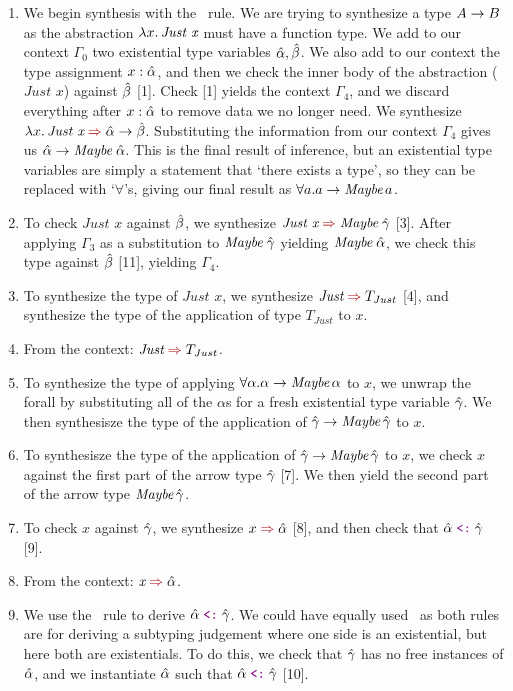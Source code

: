 \begin{enumerate}
    \item We begin synthesis with the \ArrIntroSyn\ rule. We are trying to synthesize a type $A \rightarrow B$  as the abstraction $\lambda x.\, \textit{Just x}$ must have a function type. We add to our context $\Gamma_0$ two existential type variables $\hat{\alpha}, \hat{\beta}$. We also add to our context the type assignment $x: \hat{\alpha}$, and then we check the inner body of the abstraction ($\textit{Just x}$) against $\hat{\beta}$ [1]. Check [1] yields the context $\Gamma_4$, and we discard everything after $x: \hat{\alpha}$ to remove data we no longer need. We synthesize $\lam{x} \textit{Just x} \syn \ahat \arr \bhat$. Substituting the information from our context $\Gamma_4$ gives us $\hat{\alpha} \rightarrow \textit{Maybe}\;\hat{\alpha}$. This is the final result of inference, but an existential type variables are simply a statement that `there exists a type', so they can be replaced with `$\forall$'s, giving our final result as $\forall a. a \rightarrow \textit{Maybe}\,a$.
    \item To check $\textit{Just x}$ against $\hat{\beta}$, we synthesize $\textit{Just x} \syn \textit{Maybe}\;\chat$ [3]. After applying $\Gamma_3$ as a substitution to $\textit{Maybe}\;\hat{\gamma}$ yielding $\textit{Maybe}\;\hat{\alpha}$, we check this type against $\hat{\beta}$ [11], yielding $\Gamma_4$. 
    \item To synthesize the type of $\textit{Just x}$, we synthesize $\textit{Just} \syn T_{Just}$ [4], and synthesize the type of the application of type $T_{Just}$ to $\textit{x}$.
    \item From the context: $\textit{Just} \syn T_{Just}$.
    \item To synthesize the type of applying $\forall \alpha. \alpha \rightarrow \textit{Maybe}\,\alpha$ to $\textit{x}$, we unwrap the forall by substituting all of the $\alpha$s for a fresh existential type variable $\hat{\gamma}$. We then synthesisze the type of the application of $\hat{\gamma} \rightarrow \textit{Maybe}\,\hat{\gamma}$ to $x$.
    \item To synthesisze the type of the application of $\hat{\gamma} \rightarrow \textit{Maybe}\,\hat{\gamma}$ to $x$, we check $x$ against the first part of the arrow type $\hat{\gamma}$ [7]. We then yield the second part of the arrow type $\textit{Maybe}\,\hat{\gamma}$. 
    \item To check $x$ against $\hat{\gamma}$, we synthesize $x \syn \ahat$ [8], and then check that $\ahat \subtype \chat$ [9].
    \item From the context: $\textit{x} \syn \ahat$.
    \item We use the \SubInstL\ rule to derive $\ahat \subtype \chat$. We could have equally used \SubInstR\ as both rules are for deriving a subtyping judgement where one side is an existential, but here both are existentials. To do this, we check that $\hat{\gamma}$ has no free instances of $\hat{\alpha}$, and we instantiate $\hat{\alpha}$ such that $\ahat \subtype \chat$ [10].

\end{enumerate}
